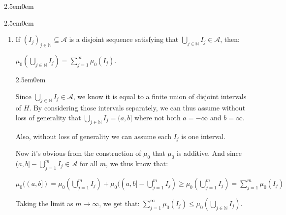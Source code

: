 \documentclass{book}
\newcommand{\hFour}{%
   \color{Cyan!80!black}
   \fontsize{12}{14}\selectfont%
}
\newenvironment{myIndent}{%
   \begin{adjustwidth}{2.5em}{0em}%
}{%
   \end{adjustwidth}%
}
\newcommand{\retTwo}{\hfill\bigbreak}
\begin{document}
\begin{myIndent}
\begin{myIndent}
\begin{enumerate}
\begin{myIndent}
            {\centering $\mu_0(I_i) = \sum\limits_{j=1}^n \mu_0(I_i \cap J_j)$ \newpage\par}

            Similarly, we can show for each $J_j$ that:

            {\centering $\mu_0(J_j) = \sum\limits_{i=1}^m \mu_0(I_i \cap J_j)$ \retTwo\par}

            Thus: $\sum\limits_{i=1}^m \mu_0(I_i) = \sum\limits_{i=1}^m\sum\limits_{j=1}^n \mu_0(I_i \cap J_j) = \sum\limits_{j=1}^n \mu(J_j)$.\retTwo
         \end{myIndent}

         \item If $(I_j)_{j \in \mathbb{N}} \subseteq \mathcal{A}$ is a disjoint sequence satisfying that $\bigcup\limits_{j\in\mathbb{N}}I_j \in \mathcal{A}$, then:\\ [-8pt]
         
         {\centering$\mu_0(\bigcup\limits_{j\in\mathbb{N}}I_j) = \sum\limits_{j=1}^\infty \mu_0(I_j)$.\retTwo\par}

         \begin{myIndent}\hFour
            Since $\bigcup\limits_{j\in\mathbb{N}}I_j \in \mathcal{A}$, we know it is equal to a finite union of disjoint intervals of $H$. By considering those intervals separately, we can thus assume without\\ [6pt] loss of generality that $\bigcup\limits_{j \in \mathbb{N}}I_j = (a, b]$ where not both $a = -\infty$ and $b = \infty$.\retTwo

            Also, without loss of generality we can assume each $I_j$ is one interval.\retTwo

            Now it's obvious from the construction of $\mu_0$ that $\mu_0$ is additive. And since $(a, b] - \bigcup\limits_{j=1}^m I_j \in \mathcal{A}$ for all $m$, we thus know that:\\ [-5pt]

            {\centering $\mu_0((a, b]) = \mu_0(\bigcup\limits_{j=1}^m I_j) + \mu_0((a, b] - \bigcup\limits_{j=1}^m I_j) \geq \mu_0(\bigcup\limits_{j=1}^m I_j) = \sum\limits_{j=1}^m \mu_0(I_j)$ \\\par}

            Taking the limit as $m \rightarrow \infty$, we get that: $\sum\limits_{j=1}^\infty \mu_0(I_j) \leq \mu_0(\bigcup\limits_{j\in \mathbb{N}} I_j)$.\\ [-6pt]
         \end{myIndent}
      \end{enumerate}
   \end{myIndent}
\end{myIndent}
\end{document}
